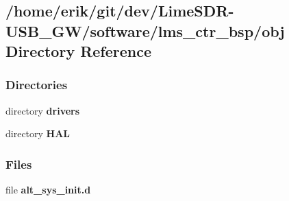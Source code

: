 \subsection{/home/erik/git/dev/\+Lime\+S\+D\+R-\/\+U\+S\+B\+\_\+\+G\+W/software/lms\+\_\+ctr\+\_\+bsp/obj Directory Reference}
\label{dir_1d89e93b42a7c025a2d3cb26a00d80c7}
\subsubsection*{Directories}
\begin{DoxyCompactItemize}
\item 
directory {\bf drivers}
\item 
directory {\bf H\+AL}
\end{DoxyCompactItemize}
\subsubsection*{Files}
\begin{DoxyCompactItemize}
\item 
file {\bf alt\+\_\+sys\+\_\+init.\+d}
\end{DoxyCompactItemize}
